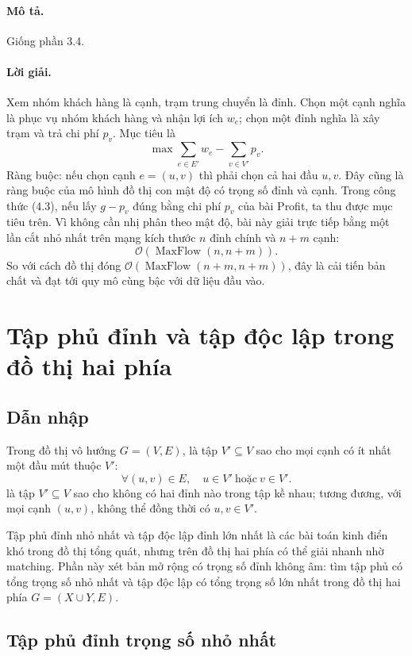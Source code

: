 \documentclass[11pt]{article}
\newcommand{\Oh}{\mathcal{O}}
\begin{document}
\paragraph{Mô tả.}
Giống phần 3.4.

\paragraph{Lời giải.}
Xem nhóm khách hàng là cạnh, trạm trung chuyển là đỉnh. Chọn một cạnh nghĩa là
phục vụ nhóm khách hàng và nhận lợi ích \(w_e\); chọn một đỉnh nghĩa là xây
trạm và trả chi phí \(p_v\). Mục tiêu là
\[
  \max \sum_{e\in E'}w_e-\sum_{v\in V'}p_v.
\]
Ràng buộc: nếu chọn cạnh \(e=(u,v)\) thì phải chọn cả hai đầu \(u,v\). Đây
cũng là ràng buộc của mô hình đồ thị con mật độ có trọng số đỉnh và cạnh.
Trong công thức (4.3), nếu lấy \(g-p_v\) đúng bằng chi phí \(p_v\) của bài
Profit, ta thu được mục tiêu trên. Vì không cần nhị phân theo mật độ, bài này
giải trực tiếp bằng một lần cắt nhỏ nhất trên mạng kích thước \(n\) đỉnh chính
và \(n+m\) cạnh:
\[
  \Oh(\operatorname{MaxFlow}(n,n+m)).
\]
So với cách đồ thị đóng \(\Oh(\operatorname{MaxFlow}(n+m,n+m))\), đây là cải
tiến bản chất và đạt tới quy mô cùng bậc với dữ liệu đầu vào.

\section{Tập phủ đỉnh và tập độc lập trong đồ thị hai phía}

\subsection{Dẫn nhập}

Trong đồ thị vô hướng \(G=(V,E)\),  là tập \(V'\subseteq V\)
sao cho mọi cạnh có ít nhất một đầu mút thuộc \(V'\):
\[
  \forall (u,v)\in E,\quad u\in V'\ \text{hoặc}\ v\in V'.
\]
 là tập \(V'\subseteq V\) sao cho không có hai đỉnh nào
trong tập kề nhau; tương đương, với mọi cạnh \((u,v)\), không thể đồng thời
có \(u,v\in V'\).

Tập phủ đỉnh nhỏ nhất và tập độc lập đỉnh lớn nhất là các bài toán kinh điển
khó trong đồ thị tổng quát, nhưng trên đồ thị hai phía có thể giải nhanh nhờ
matching. Phần này xét bản mở rộng có trọng số đỉnh không âm: tìm tập phủ có
tổng trọng số nhỏ nhất và tập độc lập có tổng trọng số lớn nhất trong đồ thị
hai phía \(G=(X\cup Y,E)\).

\subsection{Tập phủ đỉnh trọng số nhỏ nhất}
\end{document}
